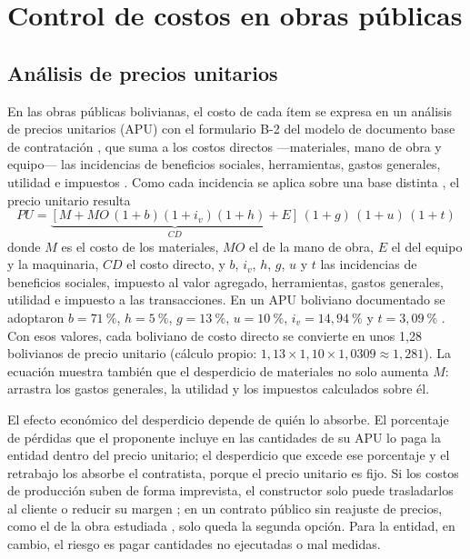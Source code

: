 \section{Control de costos en obras públicas}
\label{sec:control-costos}

\subsection{Análisis de precios unitarios}

En las obras públicas bolivianas, el costo de cada ítem se expresa en un análisis de precios unitarios (APU) con el formulario B-2 del modelo de documento base de contratación \parencite[p.~257]{cocarico2022}, que suma a los costos directos ---materiales, mano de obra y equipo--- las incidencias de beneficios sociales, herramientas, gastos generales, utilidad e impuestos \parencite[p.~254]{cocarico2022}. Como cada incidencia se aplica sobre una base distinta \parencite[pp.~256--257]{cocarico2022}, el precio unitario resulta
\begin{equation}
  PU = \underbrace{\left[M + MO\,(1+b)(1+i_v)(1+h) + E\right]}_{CD}\,(1+g)\,(1+u)\,(1+t)
  \label{eq:apu}
\end{equation}
donde $M$ es el costo de los materiales, $MO$ el de la mano de obra, $E$ el del equipo y la maquinaria, $CD$ el costo directo, y $b$, $i_v$, $h$, $g$, $u$ y $t$ las incidencias de beneficios sociales, impuesto al valor agregado, herramientas, gastos generales, utilidad e impuesto a las transacciones. En un APU boliviano documentado se adoptaron $b = 71~\%$, $h = 5~\%$, $g = 13~\%$, $u = 10~\%$, $i_v = 14{,}94~\%$ y $t = 3{,}09~\%$ \parencite[p.~256]{cocarico2022}. Con esos valores, cada boliviano de costo directo se convierte en unos 1,28 bolivianos de precio unitario (cálculo propio: $1{,}13 \times 1{,}10 \times 1{,}0309 \approx 1{,}281$). La ecuación muestra también que el desperdicio de materiales no solo aumenta $M$: arrastra los gastos generales, la utilidad y los impuestos calculados sobre él.

El efecto económico del desperdicio depende de quién lo absorbe. El porcentaje de pérdidas que el proponente incluye en las cantidades de su APU lo paga la entidad dentro del precio unitario; el desperdicio que excede ese porcentaje y el retrabajo los absorbe el contratista, porque el precio unitario es fijo. Si los costos de producción suben de forma imprevista, el constructor solo puede trasladarlos al cliente o reducir su margen \parencite[p.~24]{pons2014}; en un contrato público sin reajuste de precios, como el de la obra estudiada \parencite[p.~95]{uatf2025pao2}, solo queda la segunda opción. Para la entidad, en cambio, el riesgo es pagar cantidades no ejecutadas o mal medidas.

